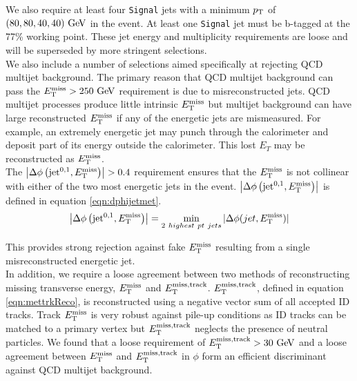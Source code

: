 \indent We also require at least four {\tt Signal} jets with a minimum $p_{\mathrm{T}}$ of $(80,80,40,40) \gev$ in the event.  At least one {\tt Signal} jet must be b-tagged at the 77\% working point.  These jet energy and multiplicity requirements are loose and will be superseded by more stringent selections. \\


\indent We also include a number of selections aimed specifically at rejecting QCD multijet background.  The primary reason that QCD multijet background can pass the $\met > 250 \gev$ requirement is due to misreconstructed jets.  QCD multijet processes produce little intrinsic $E_{\mathrm{T}}^{\mathrm{miss}}$ but multijet background can have large reconstructed $E_{\mathrm{T}}^{\mathrm{miss}}$ if any of the energetic jets are mismeasured.  For example, an extremely energetic jet may punch through the calorimeter and deposit part of its energy outside the calorimeter.  This lost $E_T$ may be reconstructed as $E_{\mathrm{T}}^{\mathrm{miss}}$.  \\

\indent The $\left|\Delta\phi\left(\mathrm{jet}^{0,1},E_{\mathrm{T}}^{\mathrm{miss}}\right)\right| > 0.4$ requirement ensures that the $E_{\mathrm{T}}^{\mathrm{miss}}$ is not collinear with either of the two most energetic jets in the event.  $\left|\Delta\phi\left(\mathrm{jet}^{0,1},E_{\mathrm{T}}^{\mathrm{miss}}\right)\right|$ is defined in equation \ref{eqn:dphijetmet}. \\

\begin{equation}
\left|\Delta\phi\left(\mathrm{jet}^{0,1},E_{\mathrm{T}}^{\mathrm{miss}}\right)\right| = \min_{2~highest~pt~jets} |\Delta \phi ( jet, E_{\mathrm{T}}^{\mathrm{miss}} ) |
\label{eqn:dphijetmet}
\end{equation}

\indent This provides strong rejection against fake $E_{\mathrm{T}}^{\mathrm{miss}}$ resulting from a single misreconstructed energetic jet.  \\

\indent In addition, we require a loose agreement between two methods of reconstructing missing transverse energy, $E_{\mathrm{T}}^{\mathrm{miss}}$ and $E_{\mathrm{T}}^{\mathrm{miss, track}}$.  $E_{\mathrm{T}}^{\mathrm{miss, track}}$, defined in equation \ref{eqn:mettrkReco}, is reconstructed using a negative vector sum of all accepted ID tracks.  Track $E_{\mathrm{T}}^{\mathrm{miss}}$ is very robust against pile-up conditions as ID tracks can be matched to a primary vertex but $E_{\mathrm{T}}^{\mathrm{miss, track}}$ neglects the presence of neutral particles.  We found that a loose requirement of $\mettrk > 30 \gev$ and a loose agreement between $E_{\mathrm{T}}^{\mathrm{miss}}$ and $E_{\mathrm{T}}^{\mathrm{miss, track}}$ in $\phi$ form an efficient discriminant against QCD multijet background. \\

